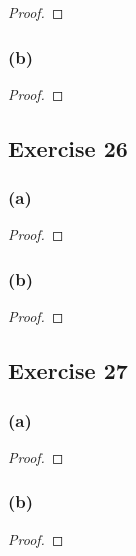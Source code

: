 \documentclass[14pt]{extarticle}
\begin{document}
\begin{proof}

\end{proof}

\subsubsection{(b)}

\begin{proof}

\end{proof}

\subsection{Exercise 26}

\subsubsection{(a)}

\begin{proof}

\end{proof}

\subsubsection{(b)}

\begin{proof}

\end{proof}

\subsection{Exercise 27}

\subsubsection{(a)}

\begin{proof}

\end{proof}

\subsubsection{(b)}

\begin{proof}

\end{proof}
\end{document}
